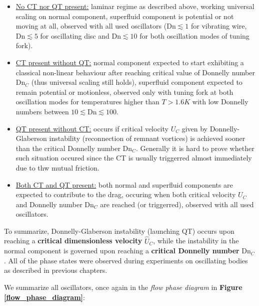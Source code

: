\begin{itemize}
	\item \underline{No CT nor QT present:} laminar regime as described above, working universal scaling on normal component, superfluid component is potential or not moving at all, observed with all used oscillators ($\text{Dn} \lesssim 1$ for vibrating wire, $\text{Dn} \lesssim 5$ for oscillating disc and $\text{Dn} \lesssim 10$ for both oscillation modes of tuning fork).

	\item \underline{CT present without QT:} normal component expected to start exhibiting a classical non-linear behaviour after reaching critical value of Donnelly number $\text{Dn}_C$ (thus universal scaling still holds), superfluid component expected to remain potential or motionless, observed only with tuning fork at both oscillation modes for temperatures higher than $T > 1.6\unit{K}$ with low Donnelly numbers between $10 \lesssim \text{Dn} \lesssim 100$.

	\item \underline{QT present without CT:} occurs if critical velocity $U_C$ given by Donnelly-Glaberson instability (reconnection of remnant vortices) is achieved sooner than the critical Donnelly number $\text{Dn}_C$. Generally it is hard to prove whether such situation occured since the CT is usually triggerred almost immediately due to thw mutual friction.

	\item \underline{Both CT and QT present:} both normal and superfluid components are expected to contribute to the drag, occuring when both critical velocity $U_C$ and Donnelly number $\text{Dn}_C$ are reached (or triggerred), observed with all used oscillators.
\end{itemize}

To summarize, Donnelly-Glaberson instability (launching QT) occurs upon reaching a \textbf{critical dimensionless velocity} $\hat{U}_C$, while the instability in the normal component is governed  upon reaching a \textbf{critical Donnelly number} $\text{Dn}_C$. All of the phase states were observed during experiments on oscillating bodies as described in previous chapters.

We summarize all oscillators, once again in the \textit{flow phase diagram} in \textbf{Figure \ref{flow_phase_diagram}}:

